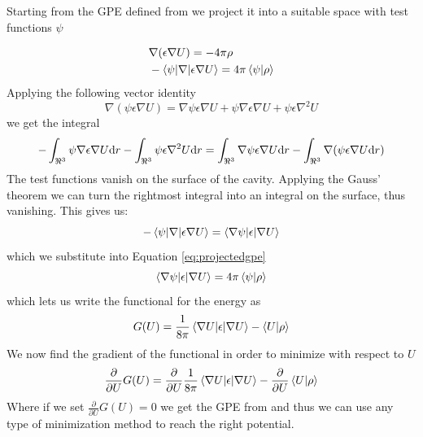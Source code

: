 \documentclass[../master_thesis.tex]{subfiles}
\begin{document}
Starting from the \ac{GPE} defined from \cite{FossoTande:2013ka} we project it
into a suitable space with test functions $\psi$

\begin{align}
  \begin{split}\label{eq:projectedgpe}
    &\nabla (\epsilon\nabla U) = -4\pi\rho\\
    &-\braket{\psi|\nabla |\epsilon\nabla U} = 4\pi \braket{\psi|\rho}
  \end{split}
\end{align}
Applying the following vector identity
\begin{equation}
\nabla (\psi \epsilon\nabla U)=\nabla \psi \epsilon \nabla U +  \psi \nabla \epsilon \nabla U +  \psi \epsilon\nabla^{2} U
\end{equation}
we get the integral
\begin{equation}
  -\int_{\real^3}\psi \nabla \epsilon \nabla U\text{d}r - \int_{\real^3}  \psi\epsilon \nabla^{2} U\text{d}r = \int_{\real^3} \nabla \psi \epsilon \nabla U\text{d}r - \int_{\real^3} \nabla (\psi \epsilon\nabla U\text{d}r)
\end{equation}
The test functions vanish on the surface of the cavity. Applying the Gauss' theorem \cite{Lipparini:2013} we can turn the rightmost integral into
an integral on the surface, thus vanishing. This gives us:
\begin{equation}
  -\braket{\psi|\nabla|\epsilon\nabla U} = \braket{\nabla \psi |\epsilon | \nabla U}
\end{equation}
which we substitute into Equation \ref{eq:projectedgpe}
\begin{equation}
  \braket{\nabla \psi |\epsilon | \nabla U} =  4\pi \braket{\psi|\rho}
\end{equation}
which lets us write the functional for the energy as \cite{Lipparini:2010bg}
\begin{equation}
  G(U) = \frac{1}{8\pi}  \braket{\nabla U |\epsilon | \nabla U} - \braket{U|\rho}
\end{equation}
We now find the gradient of the functional in order to minimize with respect to $U$
\begin{equation}
  \frac{\partial}{\partial U}G(U) = \frac{\partial}{\partial U}\frac{1}{8\pi}\braket{\nabla U|\epsilon|\nabla U} - \frac{\partial}{\partial U}\braket{U|\rho}
\end{equation}
Where if we set $\frac{\partial}{\partial U}G(U) = 0$ we get the \ac{GPE} from \cite{FossoTande:2013ka}
and thus we can use any type of minimization method to reach the right potential.


\biblio
\end{document}

